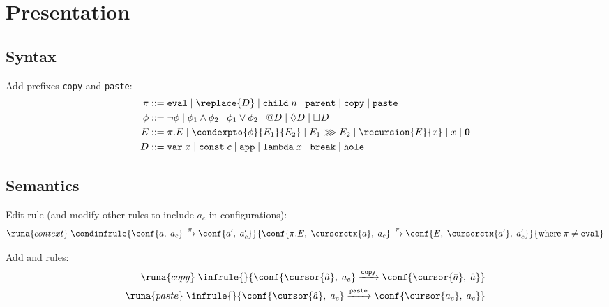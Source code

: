 \section{Presentation}
\subsection{Syntax}
Add prefixes \texttt{copy} and \texttt{paste}:
\begin{align*}
  \pi ::= \; & \texttt{eval} \mid \replace{D} \mid \texttt{child}\; n \mid \texttt{parent} \mid \texttt{copy} \mid \texttt{paste}\\
  \phi ::= \; & \neg \phi \mid \phi_1 \land \phi_2 \mid \phi_1 \lor \phi_2 \mid @D \mid \lozenge D \mid \Box D\\
  E ::= \; & \pi.E \mid \condexpto{\phi}{E_1}{E_2} \mid E_1 \ggg E_2 \mid \recursion{E}{x} \mid x \mid \mathbf{0}\\
  D ::= \; & \texttt{var}\;x \mid \texttt{const}\;c \mid \texttt{app} \mid \texttt{lambda}\; x \mid \texttt{break} \mid \texttt{hole}
\end{align*}

\subsection{Semantics}
Edit  rule (and modify other rules to include $a_c$ in configurations):
\begin{align*}
    \runa{context}\; \condinfrule{\conf{a,\; a_c} \xrightarrow{\pi} \conf{a',\; a_c'}}{\conf{\pi.E,\; \cursorctx{a},\; a_c} \xrightarrow{\pi} \conf{E,\; \cursorctx{a'},\; a_c'}}{\text{where}\; \pi \neq \texttt{eval}}\\
\end{align*}

Add  and  rules:
\begin{align*}
    \runa{copy}\; \infrule{}{\conf{\cursor{\hat{a}},\; a_c} \xrightarrow{\texttt{copy}} \conf{\cursor{\hat{a}},\; \hat{a}}}\\
    \runa{paste}\; \infrule{}{\conf{\cursor{\hat{a}},\; a_c} \xrightarrow{\texttt{paste}} \conf{\cursor{a_c},\; a_c}}
\end{align*}

